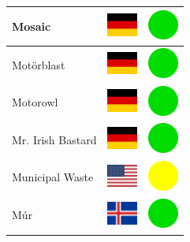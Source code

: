 \documentclass[12pt, a4paper, twoside]{report}
\begin{document}
\begin{center}
\begin{longtable}{|p{5cm}|p{2cm}|p{2cm}|}
 Mosaic                                                     & \includegraphics[width=1cm]{4x3/de} &   \includegraphics[width=1cm]{likes/y} \\ \hline
 Motörblast                                                 & \includegraphics[width=1cm]{4x3/de} &   \includegraphics[width=1cm]{likes/y} \\ \hline
 Motorowl                                                   & \includegraphics[width=1cm]{4x3/de} &   \includegraphics[width=1cm]{likes/y} \\ \hline
 Mr. Irish Bastard                                          & \includegraphics[width=1cm]{4x3/de} &   \includegraphics[width=1cm]{likes/y} \\ \hline
 Municipal Waste                                            & \includegraphics[width=1cm]{4x3/us} &   \includegraphics[width=1cm]{likes/m} \\ \hline
 Múr                                                        & \includegraphics[width=1cm]{4x3/is} &   \includegraphics[width=1cm]{likes/y} \\ \hline

\end{longtable}
\end{center}
\end{document}
